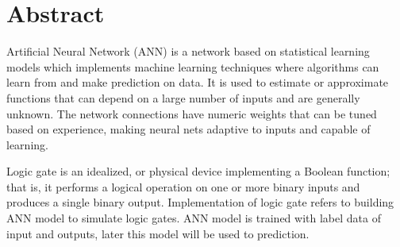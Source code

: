 \section*{Abstract}
Artificial Neural Network (ANN) is a network based on statistical learning models which implements machine learning techniques where algorithms can learn from and make prediction on data. It is used to estimate or approximate functions that can depend on a large number of inputs and are generally unknown.
The network connections have numeric weights that can be tuned based on experience, making neural nets adaptive to inputs and capable of learning.

Logic gate is an idealized, or physical device implementing a Boolean function; that is, it performs a logical operation on one or more binary inputs and produces a single binary output. Implementation of logic gate refers to building ANN model to simulate logic gates. ANN model is trained with label data of input and outputs, later this model will be used to prediction.  
\newpage